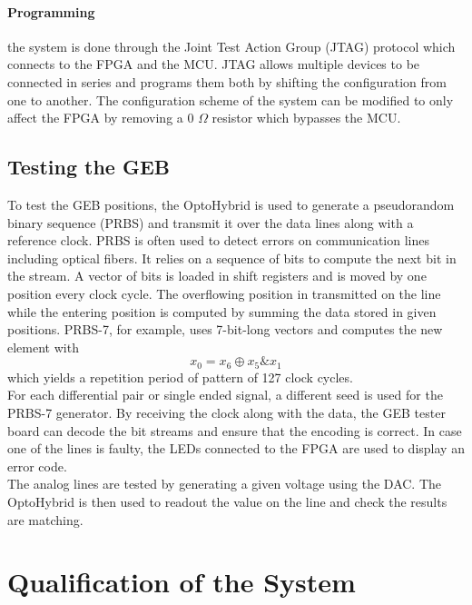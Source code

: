       \paragraph{Programming} the system is done through the Joint Test Action Group (JTAG) protocol which connects to the FPGA and the MCU. JTAG allows multiple devices to be connected in series and programs them both by shifting the configuration from one to another. The configuration scheme of the system can be modified to only affect the FPGA by removing a 0 $\Omega$ resistor which bypasses the MCU.

    \subsection{Testing the GEB}

      To test the GEB positions, the OptoHybrid is used to generate a pseudorandom binary sequence (PRBS) and transmit it over the data lines along with a reference clock. PRBS is often used to detect errors on communication lines including optical fibers. It relies on a sequence of bits to compute the next bit in the stream. A vector of bits is loaded in shift registers and is moved by one position every clock cycle. The overflowing position in transmitted on the line while the entering position is computed by summing the data stored in given positions. PRBS-7, for example, uses 7-bit-long vectors and computes the new element with
      \begin{equation}
        x_0 = x_6 \oplus x_5 \& x_1
      \end{equation}
      which yields a repetition period of pattern of 127 clock cycles. \\

      For each differential pair or single ended signal, a different seed is used for the PRBS-7 generator. By receiving the clock along with the data, the GEB tester board can decode the bit streams and ensure that the encoding is correct. In case one of the lines is faulty, the LEDs connected to the FPGA are used to display an error code. \\

      The analog lines are tested by generating a given voltage using the DAC. The OptoHybrid is then used to readout the value on the line and check the results are matching.

  \section{Qualification of the System}

